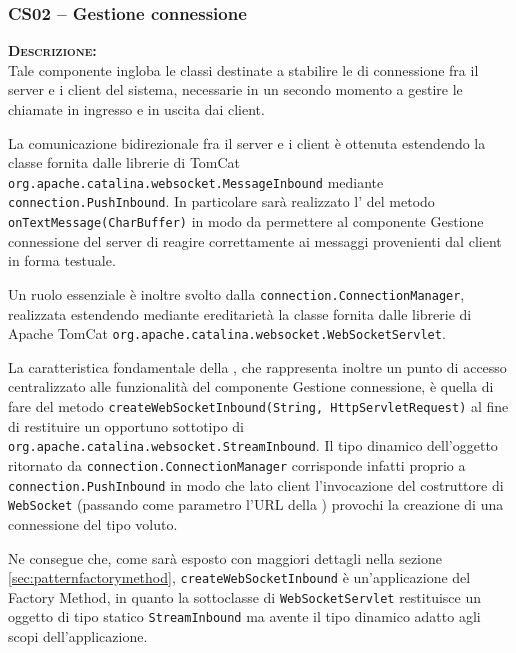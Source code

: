 \subsubsection{CS02 -- Gestione connessione}\label{sec:cs02}
\begin{description}
	\item{\scshape\bfseries Descrizione:}\\
Tale componente ingloba le classi destinate a stabilire le  di connessione fra il server e i client del sistema, necessarie in un secondo momento a gestire le chiamate in ingresso e in uscita dai client.

La comunicazione bidirezionale fra il server e i client è ottenuta estendendo la classe fornita dalle librerie di TomCat \texttt{org.apache.catalina.websocket.MessageInbound} mediante \texttt{connection.PushInbound}. In particolare sarà realizzato l' del metodo \texttt{onTextMessage(CharBuffer)} in modo da permettere al componente \textsf{Gestione connessione} del server di reagire correttamente ai messaggi provenienti dal client in forma testuale.

Un ruolo essenziale è inoltre svolto dalla  \texttt{connection.ConnectionManager}, realizzata estendendo mediante ereditarietà la classe fornita dalle librerie di Apache TomCat \texttt{org.apache.catalina.websocket.WebSocketServlet}.

La caratteristica fondamentale della , che rappresenta inoltre un punto di accesso centralizzato alle funzionalità del componente \textsf{Gestione connessione}, è quella di fare  del metodo \texttt{createWebSocketInbound(String, HttpServletRequest)} al fine di restituire un opportuno sottotipo di \texttt{org.apache.catalina.websocket.StreamInbound}. Il tipo dinamico dell'oggetto ritornato da \texttt{connection.ConnectionManager} corrisponde infatti proprio a \texttt{connection.PushInbound} in modo che lato client l'invocazione del costruttore di \texttt{WebSocket} (passando come parametro l'URL della ) provochi la creazione di una connessione del tipo voluto.

Ne consegue che, come sarà esposto con maggiori dettagli nella sezione \vref{sec:patternfactorymethod}, \texttt{createWebSocketInbound} è un'applicazione del  Factory Method, in quanto la sottoclasse di \texttt{WebSocketServlet} restituisce un oggetto di tipo statico \texttt{StreamInbound} ma avente il tipo dinamico adatto agli scopi dell'applicazione.


\end{description}
